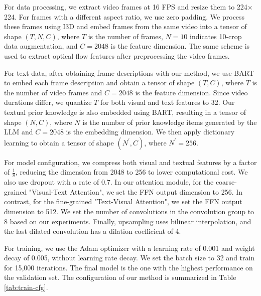 For data processing, we extract video frames at 16 FPS and resize them to 224$\times$224. For frames with a different aspect ratio, we use zero padding. We process these frames using I3D and embed frames from the same video into a tensor of shape $(T, N, C)$, where $T$ is the number of frames, $N=10$ indicates 10-crop data augmentation, and $C=2048$ is the feature dimension. The same scheme is used to extract optical flow features after preprocessing the video frames.

For text data, after obtaining frame descriptions with our method, we use BART to embed each frame description and obtain a tensor of shape $(T, C)$, where $T$ is the number of video frames and $C=2048$ is the feature dimension. Since video durations differ, we quantize $T$ for both visual and text features to 32. Our textual prior knowledge is also embedded using BART, resulting in a tensor of shape $(N, C)$, where $N$ is the number of prior knowledge items generated by the LLM and $C=2048$ is the embedding dimension. We then apply dictionary learning to obtain a tensor of shape $(N^{'}, C)$, where $N^{'}=256$.

For model configuration, we compress both visual and textual features by a factor of $\frac{1}{8}$, reducing the dimension from 2048 to 256 to lower computational cost. We also use dropout with a rate of 0.7. In our attention module, for the coarse-grained "Visual-Text Attention", we set the FFN output dimension to 256. In contrast, for the fine-grained "Text-Visual Attention", we set the FFN output dimension to 512. We set the number of convolutions in the convolution group to 8 based on our experiments. Finally, upsampling uses bilinear interpolation, and the last dilated convolution has a dilation coefficient of 4.

For training, we use the Adam optimizer with a learning rate of 0.001 and weight decay of 0.005, without learning rate decay. We set the batch size to 32 and train for 15,000 iterations. The final model is the one with the highest performance on the validation set. The configuration of our method is summarized in Table \ref{tab:train-cfg}.

